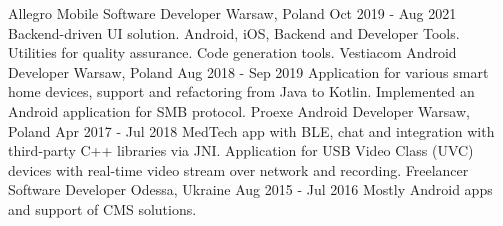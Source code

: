 
\begin{cvsection}[Experience]
  \cvexperience
    {Allegro}
    {Mobile Software Developer}
    {Warsaw, Poland}
    {Oct 2019 - Aug 2021}
    {
      Backend-driven UI solution. Android, iOS, Backend and Developer Tools.
      \newline
      Utilities for quality assurance. Code generation tools.
    }
  \cvexperience
    {Vestiacom}
    {Android Developer}
    {Warsaw, Poland}
    {Aug 2018 - Sep 2019}
    {
      Application for various smart home devices, support and refactoring from Java to Kotlin.
      \newline
      Implemented an Android application for SMB protocol.
    }
  \cvexperience
    {Proexe}
    {Android Developer}
    {Warsaw, Poland}
    {Apr 2017 - Jul 2018}
    {
      MedTech app with BLE, chat and integration with third-party C++ libraries via JNI.
      \newline
      Application for USB Video Class (UVC) devices with real-time video stream over network and recording.
    }
  \cvexperience
    {Freelancer}
    {Software Developer}
    {Odessa, Ukraine}
    {Aug 2015 - Jul 2016}
    {
      Mostly Android apps and support of CMS solutions.
    }
\end{cvsection}
